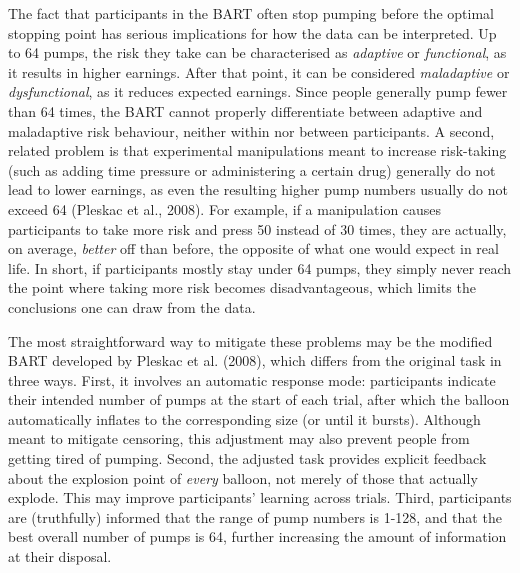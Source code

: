\documentclass[serif, twocolumn, review]{jote-article}
\begin{document}
The fact that participants in the BART often stop pumping before the optimal stopping point has serious implications for how the data can be interpreted. Up to 64 pumps, the risk they take can be characterised as \textit{adaptive} or \textit{functional}, as it results in higher earnings. After that point, it can be considered \textit{maladaptive} or \textit{dysfunctional}, as it reduces expected earnings. Since people generally pump fewer than 64 times, the BART cannot properly differentiate between adaptive and maladaptive risk behaviour, neither within nor between participants. A second, related problem is that experimental manipulations meant to increase risk-taking (such as adding time pressure or administering a certain drug) generally do not lead to lower earnings, as even the resulting higher pump numbers usually do not exceed 64 (Pleskac et al., 2008). For example, if a manipulation causes participants to take more risk and press 50 instead of 30 times, they are actually, on average, \textit{better} off than before, the opposite of what one would expect in real life. In short, if participants mostly stay under 64 pumps, they simply never reach the point where taking more risk becomes disadvantageous, which limits the conclusions one can draw from the data.

The most straightforward way to mitigate these problems may be the modified BART developed by Pleskac et al. (2008), which differs from the original task in three ways. First, it involves an automatic response mode: participants indicate their intended number of pumps at the start of each trial, after which the balloon automatically inflates to the corresponding size (or until it bursts). Although meant to mitigate censoring, this adjustment may also prevent people from getting tired of pumping. Second, the adjusted task provides explicit feedback about the explosion point of \textit{every} balloon, not merely of those that actually explode. This may improve participants' learning across trials. Third, participants are (truthfully) informed that the range of pump numbers is 1-128, and that the best overall number of pumps is 64, further increasing the amount of information at their disposal.
\end{document}
